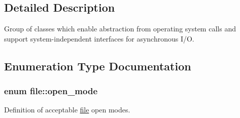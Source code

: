 \subsection{Detailed Description}
Group of classes which enable abstraction from operating system calls and support system-independent interfaces for asynchronous I/O. 

\subsection{Enumeration Type Documentation}
\hypertarget{group__iolayer_ge71b15e0014e7ce4dc13c8f83aa97582}{
\subsubsection[{open\_\-mode}]{\setlength{\rightskip}{0pt plus 5cm}enum {\bf file::open\_\-mode}}}
\label{group__iolayer_ge71b15e0014e7ce4dc13c8f83aa97582}


Definition of acceptable \hyperlink{classfile}{file} open modes. 

